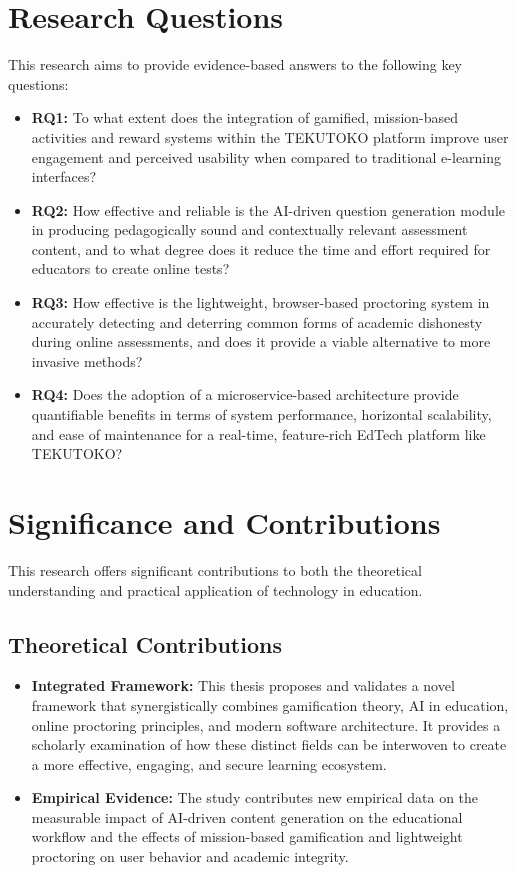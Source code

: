 \section{Research Questions}
\label{sec:intro_questions}
This research aims to provide evidence-based answers to the following key questions:
\begin{itemize}
    \item \textbf{RQ1:} To what extent does the integration of gamified, mission-based activities and reward systems within the TEKUTOKO platform improve user engagement and perceived usability when compared to traditional e-learning interfaces?
    \item \textbf{RQ2:} How effective and reliable is the AI-driven question generation module in producing pedagogically sound and contextually relevant assessment content, and to what degree does it reduce the time and effort required for educators to create online tests?
    \item \textbf{RQ3:} How effective is the lightweight, browser-based proctoring system in accurately detecting and deterring common forms of academic dishonesty during online assessments, and does it provide a viable alternative to more invasive methods?
    \item \textbf{RQ4:} Does the adoption of a microservice-based architecture provide quantifiable benefits in terms of system performance, horizontal scalability, and ease of maintenance for a real-time, feature-rich EdTech platform like TEKUTOKO?
\end{itemize}

\section{Significance and Contributions}
\label{sec:intro_contributions}
This research offers significant contributions to both the theoretical understanding and practical application of technology in education.

\subsection{Theoretical Contributions}
\begin{itemize}
    \item \textbf{Integrated Framework:} This thesis proposes and validates a novel framework that synergistically combines gamification theory, AI in education, online proctoring principles, and modern software architecture. It provides a scholarly examination of how these distinct fields can be interwoven to create a more effective, engaging, and secure learning ecosystem.
    \item \textbf{Empirical Evidence:} The study contributes new empirical data on the measurable impact of AI-driven content generation on the educational workflow and the effects of mission-based gamification and lightweight proctoring on user behavior and academic integrity.
\end{itemize}

